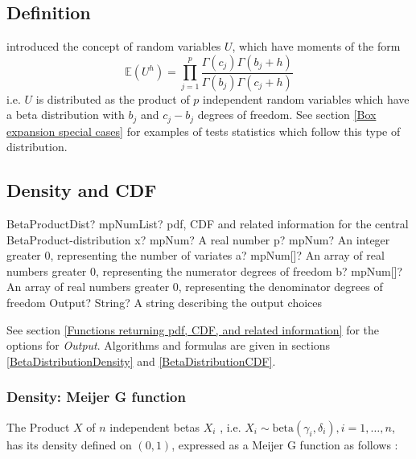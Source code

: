 \subsection{Definition}
\label{BetaProductDistributionDistributionDefinition}

\cite{Wilks_1932} introduced the concept of random  variables $U$, which have moments of the form
\begin{equation}
	\mathbb{E}(U^h) = \prod_{j=1}^p \frac{\Gamma(c_j)\Gamma(b_j +h)}{\Gamma(b_j)\Gamma(c_j+h)}
\end{equation}
i.e. $U$ is distributed as the product of $p$ independent random variables which have a beta distribution with $b_j$ and $c_j-b_j$ degrees of freedom.
See section \ref{Box expansion special cases} for examples of tests statistics which follow this type of distribution.



\subsection{Density and CDF}

\begin{mpFunctionsExtract}
	\mpFunctionFiveNotImplemented
	{BetaProductDist? mpNumList? pdf, CDF and related information for the central BetaProduct-distribution}
	{x? mpNum? A real number}
	{p? mpNum? An integer greater 0, representing the number of variates}
	{a? mpNum[]? An array of real numbers greater 0, representing the numerator  degrees of freedom}
	{b? mpNum[]? An array of real numbers greater 0, representing the denominator degrees of freedom}
	{Output? String? A string describing the output choices}
\end{mpFunctionsExtract}


\vspace{0.3cm}
See section \ref{Functions returning pdf, CDF, and related information} for the options for {\itshape\sffamily Output}. Algorithms and formulas are given in sections \ref{BetaDistributionDensity} and \ref{BetaDistributionCDF}.


\subsubsection{Density: Meijer G function}

The Product $X$ of $n$ independent betas $X_i$ , i.e. $X_i \sim \text{beta}(\gamma_i,\delta_i), i=1,\ldots,n$, has its density defined on $(0,1)$, expressed as a Meijer G function as follows \citep{PhamGia_2008, Mathai_book_2010}:

